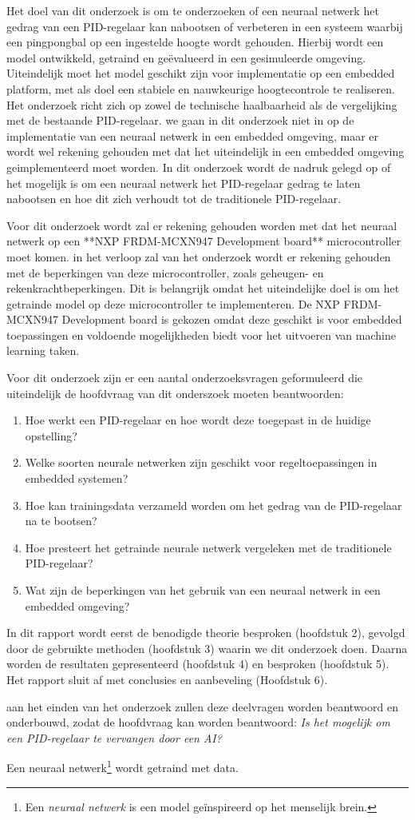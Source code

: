 Het doel van dit onderzoek is om te onderzoeken of een neuraal netwerk het gedrag van een PID-regelaar kan nabootsen of verbeteren in een systeem waarbij een pingpongbal op een ingestelde hoogte wordt gehouden. Hierbij wordt een model ontwikkeld, getraind en geëvalueerd in een gesimuleerde omgeving. Uiteindelijk moet het model geschikt zijn voor implementatie op een embedded platform, met als doel een stabiele en nauwkeurige hoogtecontrole te realiseren. Het onderzoek richt zich op zowel de technische haalbaarheid als de vergelijking met de bestaande PID-regelaar. we gaan in dit onderzoek niet in op de implementatie van een neuraal netwerk in een embedded omgeving, maar er wordt wel rekening gehouden met dat het uiteindelijk in een embedded omgeving geimplementeerd moet worden. In dit onderzoek wordt de nadruk gelegd op of het mogelijk is om een neuraal netwerk het PID-regelaar gedrag te laten nabootsen en hoe dit zich verhoudt tot de traditionele PID-regelaar.

Voor dit onderzoek wordt zal er rekening gehouden worden met dat het neuraal netwerk op een **NXP FRDM-MCXN947 Development board** microcontroller moet komen. in het verloop zal van het onderzoek wordt er rekening gehouden met de beperkingen van deze microcontroller, zoals geheugen- en rekenkrachtbeperkingen. Dit is belangrijk omdat het uiteindelijke doel is om het getrainde model op deze microcontroller te implementeren. De NXP FRDM-MCXN947 Development board is gekozen omdat deze geschikt is voor embedded toepassingen en voldoende mogelijkheden biedt voor het uitvoeren van machine learning taken.

Voor dit onderzoek zijn er een aantal onderzoeksvragen geformuleerd die uiteindelijk de hoofdvraag van dit onderszoek moeten beantwoorden:
\begin{enumerate}
  \item Hoe werkt een PID-regelaar en hoe wordt deze toegepast in de huidige opstelling?
  \item Welke soorten neurale netwerken zijn geschikt voor regeltoepassingen in embedded systemen?
  \item Hoe kan trainingsdata verzameld worden om het gedrag van de PID-regelaar na te bootsen?
  \item Hoe presteert het getrainde neurale netwerk vergeleken met de traditionele PID-regelaar?
  \item Wat zijn de beperkingen van het gebruik van een neuraal netwerk in een embedded omgeving?
\end{enumerate}

In dit rapport wordt eerst de benodigde theorie besproken (hoofdstuk 2), gevolgd door de gebruikte methoden (hoofdstuk 3) waarin we dit onderzoek doen. Daarna worden de resultaten gepresenteerd (hoofdstuk 4) en besproken (hoofdstuk 5). Het rapport sluit af met conclusies en aanbeveling (Hoofdstuk 6).

aan het einden van het onderzoek zullen deze deelvragen worden beantwoord en onderbouwd, zodat de hoofdvraag kan worden beantwoord: \textit{Is het mogelijk om een PID-regelaar te vervangen door een AI?}

Een neuraal netwerk\footnote{Een \textit{neuraal netwerk} is een model geïnspireerd op het menselijk brein.} wordt getraind met data.
